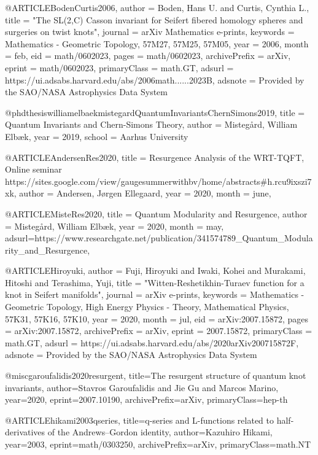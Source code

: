 @ARTICLE{BodenCurtis2006,
	author = {{Boden}, Hans U. and {Curtis}, Cynthia L.},
	title = "{The SL(2,C) Casson invariant for Seifert fibered homology spheres and surgeries on twist knots}",
	journal = {arXiv Mathematics e-prints},
	keywords = {Mathematics - Geometric Topology, 57M27, 57M25, 57M05},
	year = 2006,
	month = feb,
	eid = {math/0602023},
	pages = {math/0602023},
	archivePrefix = {arXiv},
	eprint = {math/0602023},
	primaryClass = {math.GT},
	adsurl = {https://ui.adsabs.harvard.edu/abs/2006math......2023B},
	adsnote = {Provided by the SAO/NASA Astrophysics Data System}
}



@phdthesis{williamelbaekmistegardQuantumInvariantsChernSimons2019,
	title = {Quantum {{Invariants}} and {{Chern}}-{{Simons Theory}}},
	author = {{Mistegård}, William Elbæk},
	year = {2019},
	school = {Aarhus University}
}


@ARTICLE{AndersenRes2020,
	title = {Resurgence Analysis of the WRT-TQFT, Online seminar https://sites.google.com/view/gaugesummerwithbv/home/abstracts#h.rcu9ixszi7xk},
	author = {{Andersen}, Jørgen Ellegaard},
	year = {2020},
	month = june,
}

@ARTICLE{MisteRes2020,
	title = {Quantum Modularity and Resurgence},
	author = {{Mistegård}, William Elbæk},
	year = {2020},
	month = may,
	adsurl={https://www.researchgate.net/publication/341574789_Quantum_Modularity_and_Resurgence},
}

@ARTICLE{Hiroyuki,
       author = {{Fuji}, Hiroyuki and {Iwaki}, Kohei and {Murakami}, Hitoshi and
         {Terashima}, Yuji},
        title = "{Witten-Reshetikhin-Turaev function for a knot in Seifert manifolds}",
      journal = {arXiv e-prints},
     keywords = {Mathematics - Geometric Topology, High Energy Physics - Theory, Mathematical Physics, 57K31, 57K16, 57K10},
         year = 2020,
        month = jul,
          eid = {arXiv:2007.15872},
        pages = {arXiv:2007.15872},
archivePrefix = {arXiv},
       eprint = {2007.15872},
 primaryClass = {math.GT},
       adsurl = {https://ui.adsabs.harvard.edu/abs/2020arXiv200715872F},
      adsnote = {Provided by the SAO/NASA Astrophysics Data System}
}



@misc{garoufalidis2020resurgent,
    title={The resurgent structure of quantum knot invariants},
    author={Stavros Garoufalidis and Jie Gu and Marcos Marino},
    year={2020},
    eprint={2007.10190},
    archivePrefix={arXiv},
    primaryClass={hep-th}
}

@ARTICLE{hikami2003qseries,
	title={q-series and L-functions related to half-derivatives of the Andrews--Gordon identity},
	author={Kazuhiro Hikami},
	year={2003},
	eprint={math/0303250},
	archivePrefix={arXiv},
	primaryClass={math.NT}
}

